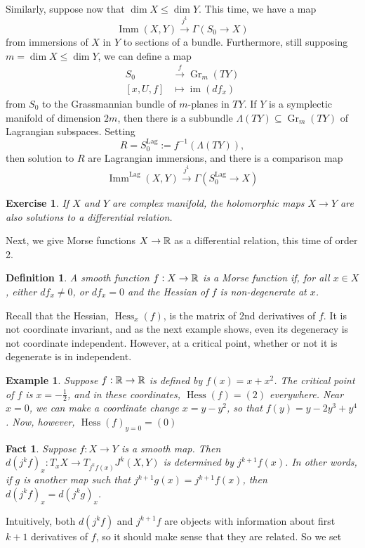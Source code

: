 \documentclass{article}
\newtheorem{fact}[theorem]{Fact}
\newtheorem{definition}[theorem]{Definition}
\newtheorem{example}[theorem]{Example}
\newtheorem{exercise}[theorem]{Exercise}
\newtheorem{proposed work}[theorem]{Proposed Work}
\theoremstyle{definition}
\DeclareMathOperator{\Imm}{Imm}
\DeclareMathOperator{\Gr}{Gr}
\DeclareMathOperator{\image}{im}
\DeclareMathOperator{\Hess}{Hess}
\begin{document}
Similarly, suppose now that $\dim X\le \dim Y$. This time, we have a map
\[\Imm(X,Y)\xrightarrow{j^1}\Gamma(S_0\to X)\]
from immersions of $X$ in $Y$ to sections of a bundle. Furthermore, still supposing $m=\dim X\le \dim Y$, we can define a map
\begin{align*}
  S_0&\xrightarrow{f} \Gr_m(TY)\\
       [x,U,f]&\mapsto \image(df_x)
\end{align*}
from $S_0$ to the Grassmannian bundle of $m$-planes in $TY$. If $Y$ is a symplectic manifold of dimension $2m$, then there is a subbundle $\Lambda(TY)\subseteq \Gr_m(TY)$ of Lagrangian subspaces. Setting
\[
R = S_0^{\text{Lag}}:= f^{-1}(\Lambda(TY)),
\]
then solution to $R$ are Lagrangian immersions, and there is a comparison map
\[
\Imm^\text{Lag}(X,Y)\xrightarrow{j^1}\Gamma(S^\text{Lag}_0\to X)
\]
\begin{exercise}
  If $X$ and $Y$ are complex manifold, the holomorphic maps $X\to Y$ are also solutions to a differential relation.
\end{exercise}
Next, we give Morse functions $X\to \mathbb R$ as a differential relation, this time of order 2.
\begin{definition}
  A smooth function $f: X\to \mathbb R$ is a \textit{Morse function} if, for all $x\in X$, either $df_x\neq 0$, or $df_x=0$ and the Hessian of $f$ is non-degenerate at $x$.
\end{definition}
Recall that the Hessian, $\Hess_x(f)$, is the matrix of 2nd derivatives of $f$. It is not coordinate invariant, and as the next example shows, even its degeneracy is not coordinate independent. However, at a critical point, whether or not it is degenerate is in independent.
\begin{example}
  Suppose $f:\mathbb R \to \mathbb R$ is defined by $f(x)=x+x^2$. The critical point of $f$ is $x=-\frac12$, and in these coordinates, $\Hess(f)=(2)$ everywhere. Near $x=0$, we can make a coordinate change $x=y-y^2$, so that $f(y)=y-2y^3+y^4$. Now, however, $\Hess(f)_{y=0}=(0)$
\end{example}
\begin{fact}
Suppose $f:X\to Y$ is a smooth map. Then $d(j^kf)_x: T_xX\to T_{j^kf(x)}J^k(X,Y)$ is determined by $j^{k+1}f(x)$. In other words, if $g$ is another map such that $j^{k+1}g(x)=j^{k+1}f(x)$, then $d(j^kf)_x=d(j^kg)_x$.
\end{fact}
Intuitively, both $d(j^kf)$ and $j^{k+1}f$ are objects with information about first $k+1$ derivatives of $f$, so it should make sense that they are related. So we set
\end{document}
